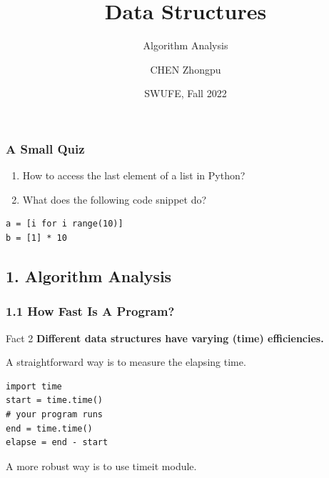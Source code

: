 \documentclass[aspectratio=169, 14pt]{beamer}
\title[Data Structures] %
{Data Structures}
\subtitle{Algorithm Analysis}
\author[CHEN Zhongpu] %
{CHEN Zhongpu}
\institute[] %
{
	School of Computing and Artificial Intelligence \\
	\href{mailto:zpchen@swufe.edu.cn}{zpchen@swufe.edu.cn}
}
\date[] %
{SWUFE, Fall 2022}
\begin{document}
\frame{\titlepage}

\begin{frame}[fragile]
	\frametitle{A Small Quiz}
	\begin{enumerate}
		\item How to access the last element of a \alert{list} in Python?
		\item What does the following code snippet do?
	\end{enumerate}

	\begin{verbatim}
a = [i for i range(10)]
b = [1] * 10
    \end{verbatim}
\end{frame}

{
\begin{frame}
	\section{\textcolor{darkmidnightblue}{1. Algorithm Analysis}}
\end{frame}
}

\begin{frame}[fragile]
	\frametitle{1.1 How Fast Is A Program?}
	\begin{block}{Fact 2}
		\textbf{Different data structures have varying (time) \alert{efficiencies}.}
	\end{block}
	A straightforward way is to measure the elapsing time.
	\begin{verbatim}
import time
start = time.time()
# your program runs
end = time.time()
elapse = end - start
\end{verbatim}
	A more robust way is to use \alert{timeit} module.
\end{frame}
\end{document}
